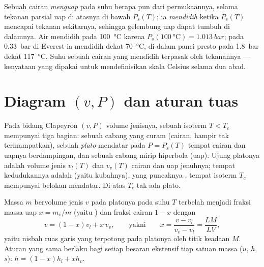 \begin{remark}\label{rem:b1:phase-changes:boiling}
Sebuah cairan \emph{menguap} pada suhu berapa pun dari permukaannya, selama
tekanan parsial uap di atasnya di bawah $P_s(T)$; ia
\emph{mendidih} ketika $P_s(T)$ mencapai tekanan sekitarnya, sehingga gelembung
uap dapat tumbuh di dalamnya. Air mendidih pada \qty{100}{\degreeCelsius}
karena $P_s(\qty{100}{\degreeCelsius}) = \qty{1.013}{bar}$; pada
\qty{0.33}{bar} di Everest ia mendidih dekat \qty{70}{\degreeCelsius}, di dalam
panci presto pada \qty{1.8}{bar} dekat \qty{117}{\degreeCelsius}. Suhu
sebuah cairan yang mendidih terpasak oleh tekanannya --- kenyataan yang
dipakai untuk mendefinisikan skala Celsius selama dua abad.
\end{remark}

\section{Diagram $(v, P)$ dan aturan tuas}

\begin{proposition}\label{prop:b1:phase-changes:andrews}
Pada bidang Clapeyron $(v, P)$ volume jenisnya, sebuah isoterm
$T < T_c$ mempunyai tiga bagian: sebuah cabang yang curam (cairan, hampir
tak termampatkan), sebuah \emph{plato} mendatar pada $P = P_s(T)$ tempat cairan
dan uapnya berdampingan, dan sebuah cabang mirip hiperbola (uap). Ujung
platonya adalah volume jenis $v_l(T)$ dan $v_v(T)$ cairan dan uap
jenuhnya; tempat kedudukannya adalah \emph{} (yaitu
kubahnya), yang puncaknya , tempat isoterm $T_c$
mempunyai belokan mendatar. Di atas $T_c$ tak ada plato.
\end{proposition}
\admitted

\begin{theorem}\label{thm:b1:phase-changes:lever}
Massa $m$ bervolume jenis $v$ pada platonya pada suhu $T$ terbelah menjadi
fraksi massa uap $x = m_v/m$ (yaitu \emph{}) dan fraksi cairan
$1 - x$ dengan
\[
v = (1 - x)v_l + x\,v_v , \qquad\text{yakni}\qquad
x = \frac{v - v_l}{v_v - v_l} = \frac{LM}{LV} ,
\]
yaitu nisbah ruas garis yang terpotong pada platonya oleh titik keadaan $M$.
Aturan yang sama berlaku bagi setiap besaran ekstensif tiap satuan massa ($u$,
$h$, $s$): $h = (1 - x)h_l + xh_v$.
\end{theorem}

